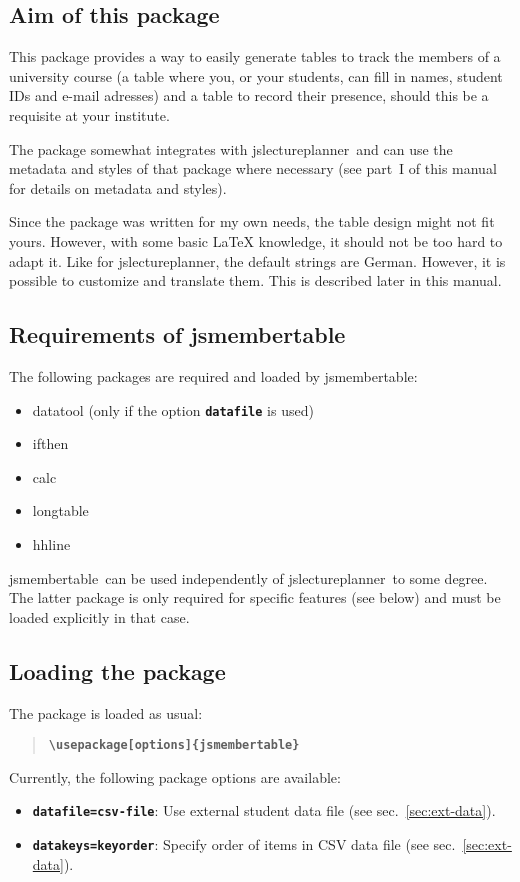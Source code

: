 \documentclass[english]{article}
\newcommand*\jmacro[1]{\textbf{\texttt{#1}}}
\newcommand*\jcsmacro[1]{\jmacro{\textbackslash{#1}}}
\newcommand*\joption[1]{\textbf{\texttt{#1}}}
\newcommand*\jparam[1]{\angus #1\angud}
\newcommand*\jslp{\textsf{jslectureplanner}}
\newcommand*\jsmt{\textsf{jsmembertable}}
\begin{document}
\subsection{Aim of this package}

This package provides a way to easily generate tables to track the members of a
university course (a table where you, or your students, can fill in names,
student IDs and e-mail adresses) and a table to record their presence,
should this be a requisite at your institute.

The package somewhat integrates with \jslp\ and can use the
metadata and styles of that package where necessary (see part~I of this
manual for details on metadata and styles).

Since the package was written for my own needs, the table design might not fit yours.
However, with some basic LaTeX knowledge, it should not be too hard to adapt it.
Like for \jslp, the default strings are German.
However, it is possible to customize and translate them.
This is described later in this manual.


\subsection{Requirements of \jsmt}\label{sec:req-jsmt} 

The following packages are required and loaded by \jsmt: 
\begin{itemize}
 \setlength\itemsep{2pt}
 \item \textsf{datatool} (only if the option \joption{datafile} is used)
 \item \textsf{ifthen}
 \item \textsf{calc}
 \item \textsf{longtable}
 \item \textsf{hhline}
\end{itemize}
\jsmt\ can be used independently of
\jslp\ to some degree. The latter package is only required for specific
features (see below) and must be loaded explicitly in that case.

\subsection{Loading the package}

The package is loaded as usual:
\begin{quote}
\jcsmacro{usepackage[\jparam{options}]\{jsmembertable\}}
\end{quote}
Currently, the following package options are available:
\begin{itemize}
 \item \joption{datafile=\jparam{csv-file}}: Use external student data file (see sec.~\ref{sec:ext-data}).
 \item \joption{datakeys=\jparam{keyorder}}: Specify order of items in CSV data file (see sec.~\ref{sec:ext-data}).
\end{itemize}
\end{document}
